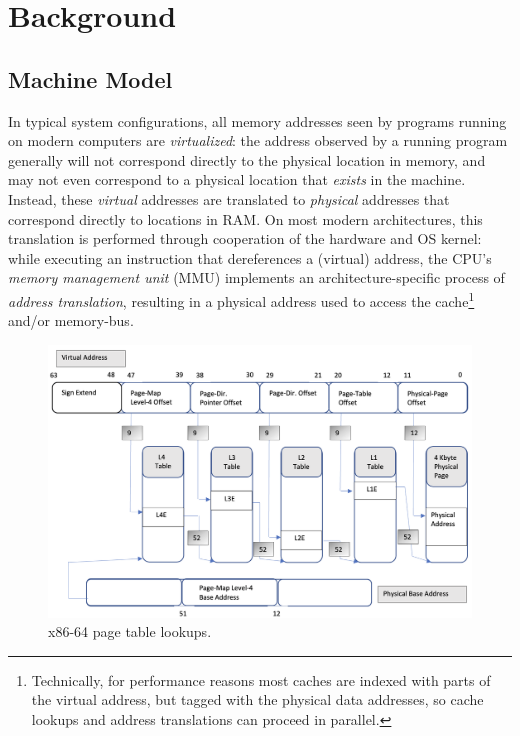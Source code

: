 \section{Background}
\label{sec:background}
\subsection{Machine Model}
\label{sec:backgroundonmachinemodel}

In typical system configurations, all memory addresses seen by programs running on modern computers are \emph{virtualized}: the address observed by a running program generally will not correspond directly to the physical location in memory, and may not even correspond to a physical location that \emph{exists} in the machine. Instead, these \emph{virtual} addresses are translated to \emph{physical} addresses that correspond directly to locations in RAM. On most modern architectures, this translation is performed through cooperation of the hardware and OS kernel: while executing an instruction that dereferences a (virtual) address, the CPU's \emph{memory management unit} (\textsc{MMU}) implements an architecture-specific process of \emph{address translation}, resulting in a physical address used to access the cache\footnote{Technically, for performance reasons most caches are indexed with parts of the virtual address, but tagged with the physical data addresses, so cache lookups and address translations can proceed in parallel.} and/or memory-bus.

\begin{figure}
    \includegraphics[width=\columnwidth]{pagetables.png}
    \caption{x86-64 page table lookups.}
    \label{fig:pagetables}
\end{figure}


